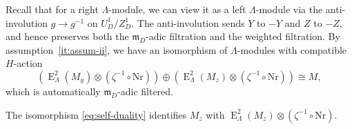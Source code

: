 \documentclass[11pt,a4paper]{article} %
\def\E{\operatorname{E}}
\begin{document}
Recall that for a right $\Lambda$-module, we can view it as a left $\Lambda$-module via the anti-involution $g\to g^{-1}$ on $U_D^1/Z_D^1$. The anti-involution sends $Y$ to $-Y$ and $Z$ to $-Z$, and hence preserves both the $\mathfrak{m}_D$-adic filtration and the weighted filtration. By assumption~\ref{it:assum-ii}, we have an isomorphism of $\Lambda$-modules with compatible $H$-action 
\[
\left(\E_\Lambda^2(M_y)\otimes(\zeta^{-1}\circ\mathrm{Nr})\right)\oplus\left(\E_\Lambda^2(M_z)\otimes(\zeta^{-1}\circ\mathrm{Nr})\right)\cong M,
\]
which is automatically $\mathfrak{m}_D$-adic filtered.

\begin{lemma}\label{lem:z-dual-z}
    The isomorphism \eqref{eq:self-duality} identifies $M_z$ with $\E_\Lambda^2(M_z)\otimes(\zeta^{-1}\circ\mathrm{Nr})$.
\end{lemma}
\end{document}
